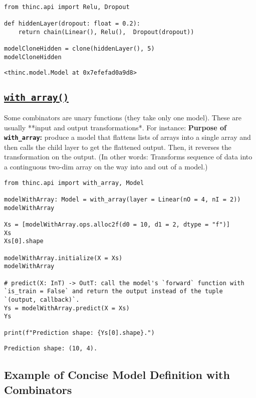 \documentclass[
]{article}
\begin{document}
\begin{verbatim}
from thinc.api import Relu, Dropout

def hiddenLayer(dropout: float = 0.2):
    return chain(Linear(), Relu(),  Dropout(dropout))

modelCloneHidden = clone(hiddenLayer(), 5)
modelCloneHidden
\end{verbatim}

\begin{verbatim}
<thinc.model.Model at 0x7efefad0a9d8>
\end{verbatim}

\hypertarget{with_array}{%
\subsection{\texorpdfstring{\href{https://thinc.ai/docs/api-layers\#with_array}{\texttt{with_array()}}}{}}\label{with_array}}

Some combinators are unary functions (they take only one model). These
are usually **input and output transformations*. For instance:
\textbf{Purpose of \texttt{with_array}:} produce a model
that flattens lists of arrays into a single array and then calls the
child layer to get the flattened output. Then, it reverses the
transformation on the output. (In other words: Transforms sequence of
data into a continguous two-dim array on the way into and out of a
model.)

\begin{verbatim}
from thinc.api import with_array, Model

modelWithArray: Model = with_array(layer = Linear(nO = 4, nI = 2))
modelWithArray

Xs = [modelWithArray.ops.alloc2f(d0 = 10, d1 = 2, dtype = "f")]
Xs
Xs[0].shape

modelWithArray.initialize(X = Xs)
modelWithArray

# predict(X: InT) -> OutT: call the model's `forward` function with `is_train = False` and return the output instead of the tuple `(output, callback)`.
Ys = modelWithArray.predict(X = Xs)
Ys

print(f"Prediction shape: {Ys[0].shape}.")
\end{verbatim}

\begin{verbatim}
Prediction shape: (10, 4).
\end{verbatim}

\hypertarget{example-of-concise-model-definition-with-combinators}{%
\subsection{Example of Concise Model Definition with
Combinators}\label{example-of-concise-model-definition-with-combinators}}
\end{document}
